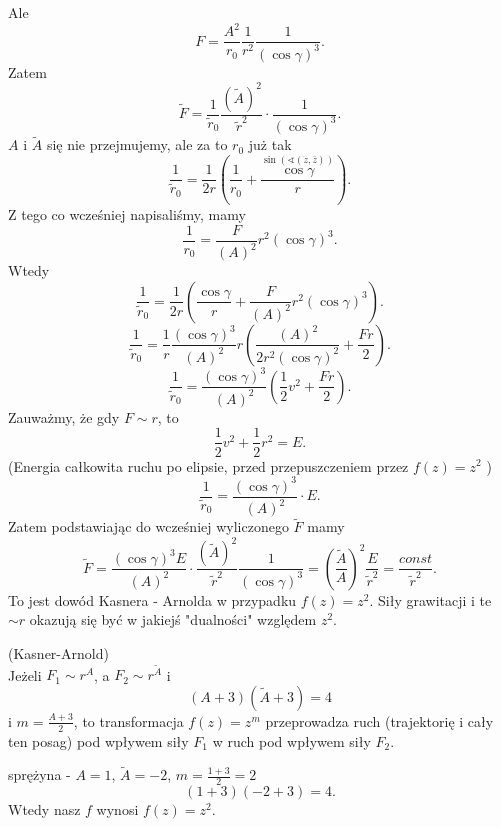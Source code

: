 \documentclass[../main.tex]{subfiles}
\begin{document}
Ale
\[
    F = \frac{A^2}{r_0}\frac{1}{r^2}\frac{1}{\left( \cos\gamma \right) ^3}
.\]
Zatem
\[
    \tilde F = \frac{1}{\tilde r_0}\frac{(\tilde A)^2}{\tilde r^2}\cdot \frac{1}{\left( \cos\gamma \right) ^3}
.\]
$A$ i $\tilde A$ się nie przejmujemy, ale za to $r_0$ już tak
\[
    \frac{1}{\tilde r_0} = \frac{1}{2 r}\left( \frac{1}{r_0} + \frac{\overset{\sin(\sphericalangle(\dot{z}, \bar{z}))}{\cos\gamma}}{r} \right)
.\]
Z tego co wcześniej napisaliśmy, mamy
\[
    \frac{1}{r_0} = \frac{F}{(A)^2}r^2(\cos\gamma)^3
.\]
Wtedy
\[
    \frac{1}{\tilde r_0} = \frac{1}{2r}\left( \frac{\cos\gamma}{r} + \frac{F}{(A)^2}r^2(\cos\gamma)^3 \right)
.\]
\[
    \frac{1}{\tilde r_0} = \frac{1}{r}\frac{(\cos\gamma)^3}{(A)^2}r\left( \frac{(A)^2}{2r^2(\cos\gamma)^2} + \frac{Fr}{2} \right)
.\]
\[
    \frac{1}{\tilde r_0} = \frac{(\cos\gamma)^3}{(A)^2}\left( \frac{1}{2}v^2 + \frac{Fr}{2} \right)
.\]
Zauważmy, że gdy $F \sim r$, to
 \[
     \frac{1}{2}v^2 + \frac{1}{2}r^2 = E
.\]
(Energia całkowita ruchu po elipsie, przed przepuszczeniem przez $f(z) = z^2$ )
\[
    \frac{1}{\tilde r_0} = \frac{(\cos\gamma)^3}{\left( A \right) ^2} \cdot E
.\]
Zatem podstawiając do wcześniej wyliczonego $\tilde F$ mamy
\[
    \tilde F = \frac{(\cos\gamma)^3 E}{(A)^2}\cdot \frac{(\tilde A)^2}{\tilde r^2}\frac{1}{(\cos\gamma)^3} = \left( \frac{\tilde A}{A} \right) ^2 \frac{E}{\tilde r^2} = \frac{const}{\tilde r^2}
.\]
To jest dowód Kasnera - Arnolda w przypadku $f(z) = z^2$. Siły grawitacji i te $\sim r$ okazują się być w jakiejś "dualności" względem $z^2$.
\begin{tw}
    (Kasner-Arnold)\\
    Jeżeli $F_1\sim r^A$, a $F_2\sim r^{\tilde A}$ i
    \[
        \left( A+3 \right)(\tilde A + 3) = 4
    \]
    i $m = \frac{A+3}{2}$, to transformacja $f(z) = z^m$ przeprowadza ruch (trajektorię i cały ten posag) pod wpływem siły $F_1$ w ruch pod wpływem siły $F_2$.
\end{tw}
\begin{przyklad}
    sprężyna - $A = 1$, $\tilde A = -2$, $m = \frac{1+3}{2} = 2$
    \[
        (1+3)(-2+3) = 4
    .\]
Wtedy nasz $f$ wynosi $f(z) = z^2$.
\end{przyklad}
\end{document}
